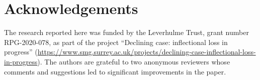 \documentclass[output=paper,colorlinks,citecolor=brown]{langscibook}
\begin{document}
\section*{Acknowledgements}
{\sloppy The research reported here was funded by the Leverhulme Trust, grant number RPG-2020-078, as part of the project “Declining case: inflectional loss in progress” (\url{https://www.smg.surrey.ac.uk/projects/declining-case-inflectional-loss-in-progress}). The authors are grateful to two anonymous reviewers whose comments and suggestions led to significant improvements in the paper.\par}



{\sloppy\printbibliography[heading=subbibliography,notkeyword=this]}
\end{document}
